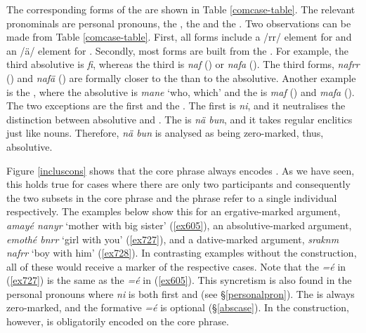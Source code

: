 The corresponding  forms of the   are shown in Table \ref{comcase-table}. The relevant pronominals are personal pronouns, the  , the   and the . Two observations can be made from Table \ref{comcase-table}. First, all forms include a /rr/ element for  and an /ä/ element for . Secondly, most forms are built from the  . For example, the third  absolutive is \emph{fi}, whereas the third   is \emph{naf} (\Sg) or \emph{nafa} (\Nsg). The  third  forms, \emph{nafrr} (\Du) and \emph{nafä} (\Pl) are formally closer to the  than to the absolutive. Another example is the , where the absolutive is \emph{mane} `who, which' and the  is \emph{maf} (\Sg) and \emph{mafa} (\Nsg). The two exceptions are the first  and the  . The first   is \emph{ni}, and it neutralises the distinction between absolutive and . The   is \emph{nä bun}, and it takes regular  enclitics just like nouns. Therefore, \emph{nä bun} is analysed as being zero-marked, thus, absolutive.%

Figure \ref{incluscons} shows that the core phrase always encodes  . As we have seen, this holds true for cases where there are only two participants and consequently the two subsets in the core phrase and the  phrase refer to a single individual respectively. The examples below show this for an ergative-marked argument, \emph{amayé nanyr} `mother with big sister' (\ref{ex605}), an absolutive-marked argument, \emph{emothé bnrr} `girl with you' (\ref{ex727}), and a dative-marked argument, \emph{sraknm nafrr} `boy with him' (\ref{ex728}). In contrasting examples without the  construction, all of these would receive a  marker of the respective cases. Note that the   \emph{=é} in (\ref{ex727}) is the same as the   \emph{=é} in (\ref{ex605}). This syncretism is also found in the personal pronouns where \emph{ni} is both first    and  (see \S{}\ref{personalpron}). The   is always zero-marked, and the  formative \emph{=é} is optional (\S{}\ref{abscase}). In the  construction, however,   is obligatorily encoded on the core phrase.

